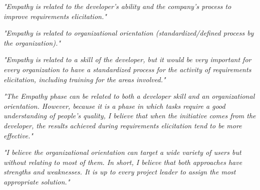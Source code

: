 \documentclass[conference]{IEEEtran}
\begin{document}
\begin{mq}
\emph{"Empathy is related to the developer's ability and the company's process to improve requirements elicitation."}
\end{mq}

\begin{mq}
\emph{"Empathy is related to organizational orientation (standardized/defined process by the organization)."}
\end{mq}

\begin{mq}
\emph{"Empathy is related to a skill of the developer, but it would be very important for every organization to have a standardized process for the activity of requirements elicitation, including training for the areas involved."}
\end{mq}

\begin{mq}
\emph{"The Empathy phase can be related to both a developer skill and an organizational orientation. However, because it is a phase in which tasks require a good understanding of people's quality, I believe that when the initiative comes from the developer, the results achieved during requirements elicitation tend to be more effective."}
\end{mq}

\begin{mq}
\emph{"I believe the organizational orientation can target a wide variety of users but without relating to most of them. In short, I believe that both approaches have strengths and weaknesses. It is up to every project leader to assign the most appropriate solution."}
\end{mq}
\end{document}
